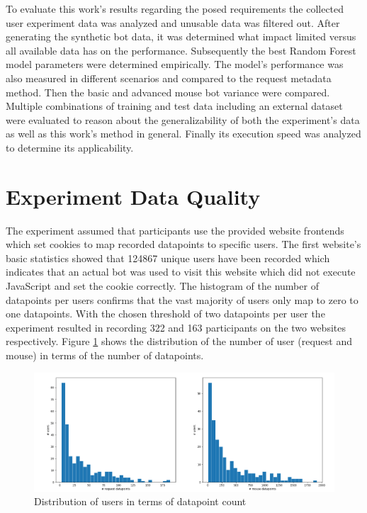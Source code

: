\documentclass[
    fontsize=12pt,
    headings=small,
    parskip=half,           %
    bibliography=totoc,
    numbers=noenddot,       %
    open=any,               %
    final,                   %
    table
]{scrreprt}
\begin{document}
To evaluate this work's results regarding the posed requirements the collected user experiment data was analyzed and unusable data was filtered out. After generating the synthetic bot data, it was determined what impact limited versus all available data has on the performance. Subsequently the best Random Forest model parameters were determined empirically. The model's performance was also measured in different scenarios and compared to the request metadata method. Then the basic and advanced mouse bot variance were compared. Multiple combinations of training and test data including an external dataset were evaluated to reason about the generalizability of both the experiment's data as well as this work's method in general. Finally its execution speed was analyzed to determine its applicability.

\section{Experiment Data Quality}

The experiment assumed that participants use the provided website frontends which set cookies to map recorded datapoints to specific users. The first website's basic statistics showed that 124867 unique users have been recorded which indicates that an actual bot was used to visit this website which did not execute JavaScript and set the cookie correctly. The histogram of the number of datapoints per users confirms that the vast majority of users only map to zero to one datapoints. With the chosen threshold of two datapoints per user the experiment resulted in recording 322 and 163 participants on the two websites respectively. Figure \ref{fig:user_dp_hist} shows the distribution of the number of user (request and mouse) in terms of the number of datapoints.

\begin{figure}[h]
    \includegraphics[width=\textwidth]{figures/user_dp_hist.png}
    \caption{Distribution of users in terms of datapoint count}
    \label{fig:user_dp_hist}
\end{figure}
\end{document}
